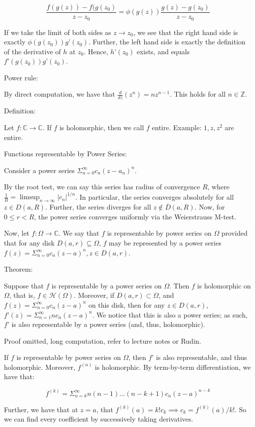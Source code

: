 \documentclass[10pt]{article}
\begin{document}
$$ \frac{f(g(z)) - f(g(z_0)}{z - z_0} = \phi(g(z)) \frac{g(z) - g(z_0)}{z - z_0} $$

If we take the limit of both sides as $z \to z_0$, we see that the right hand side is exactly $\phi(g(z_0)) g’(z_0)$. Further, the left hand side is exactly the definition of the derivative of $h$ at $z_0$. Hence, $h’(z_0)$ exists, and equals $f’(g(z_0)) g’(z_0)$.

Power rule:

By direct computation, we have that $\frac{d}{dz}(z^n) = n z^{n-1}$. This holds for all $n \in \mathbb{Z}$.

Definition:

Let $f: \mathbb{C} \to \mathbb{C}$. If $f$ is holomorphic, then we call $f$ entire. Example: $1, z, z^2$ are entire.

Functions representable by Power Series:

Consider a power series $\Sigma_{n=0}^\infty c_n (z-a_n)^n$.

By the root test, we can say this series has radius of convergence $R$, where $\frac{1}{R} = \limsup_{n \to \infty} | c_n|^{1/n}$. In particular, the series converges absolutely for all $z \in D(a,R)$. Further, the series diverges for all $z \not \in \overline{D}(a,R)$. Now, for $0 \leq r < R$, the power series converges uniformly via the Weierstrauss M-test.

Now, let $f: \Omega \to \mathbb{C}$. We say that $f$ is representable by power series on $\Omega$ provided that for any disk $D(a,r) \subseteq \Omega$, $f$ may be represented by a power series $f(z) = \Sigma_{n=0}^\infty c_n (z-a)^n, z \in D(a,r)$.

Theorem:

Suppose that $f$ is representable by a power series on $\Omega$. Then $f$ is holomorphic on $\Omega$, that is, $f \in \mathcal{H}(\Omega)$. Moreover, if $D(a,r) \subset \Omega$, and $f(z) = \Sigma_{n=0}^\infty c_n (z-a)^n$ on this disk, then for any $z \in D(a,r)$, $f’(z) = \Sigma_{n=1}^\infty nc_n(z-a)^n$. We notice that this is also a power series; as such, $f’$ is also representable by a power series (and, thus, holomorphic).

Proof omitted, long computation, refer to lecture notes or Rudin.

If $f$ is representable by power series on $\Omega$, then $f’$ is also representable, and thus holomorphic. Moreover, $f^{(n)}$ is holomorphic. By term-by-term differentiation, we have that:

$$ f^{(k)} = \Sigma_{n=k}^\infty n(n-1)...(n-k+1) c_n (z-a)^{n-k}$$

Further, we have that at $z = a$, that $f^{(k)}(a) = k! c_k \implies c_k = f^{(k)}(a)/k!$. So we can find every coefficient by successively taking derivatives. 
\end{document}
